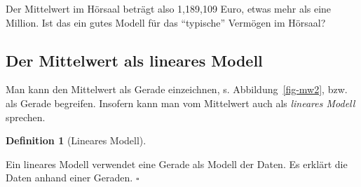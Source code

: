 \documentclass[
  letterpaper,
]{scrbook}
\theoremstyle{definition}
\theoremstyle{definition}
\theoremstyle{definition}
\newtheorem{definition}{Definition}[chapter]
\theoremstyle{remark}
\begin{document}
Der Mittelwert im Hörsaal beträgt also 1,189,109 Euro, etwas mehr als
eine Million. Ist das ein gutes Modell für das \enquote{typische}
Vermögen im Hörsaal?

\subsection{Der Mittelwert als lineares
Modell}\label{der-mittelwert-als-lineares-modell}

Man kann den Mittelwert als Gerade einzeichnen, s.
Abbildung~\ref{fig-mw2}, bzw. als Gerade begreifen. Insofern kann man
vom Mittelwert auch als \emph{lineares Modell} sprechen.

\begin{definition}[Lineares
Modell]\protect\hypertarget{def-lm}{}\label{def-lm}

Ein lineares Modell verwendet eine Gerade als Modell der Daten. Es
erklärt die Daten anhand einer Geraden. \(\square\)

\end{definition}
\end{document}

